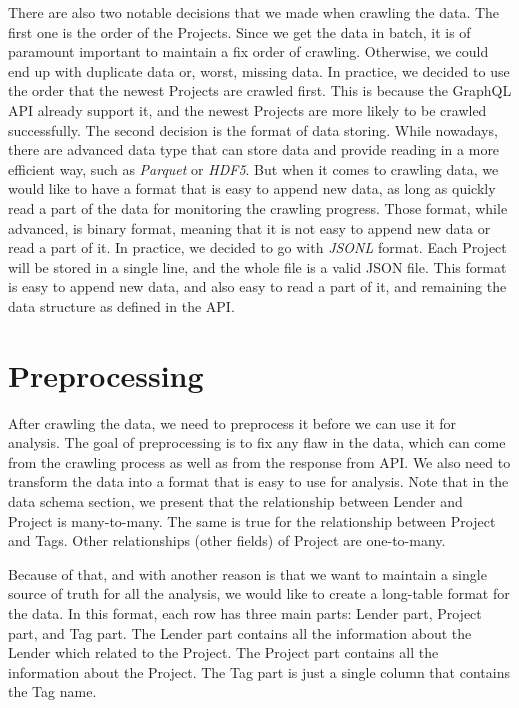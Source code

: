 There are also two notable decisions that we made when crawling the data.
The first one is the order of the Projects.
Since we get the data in batch, it is of paramount important to maintain a fix order of crawling.
Otherwise, we could end up with duplicate data or, worst, missing data.
In practice, we decided to use the order that the newest Projects are crawled first.
This is because the GraphQL API already support it, and the newest Projects are more likely to be crawled successfully.
The second decision is the format of data storing.
While nowadays, there are advanced data type that can store data and provide reading in a more efficient way,
such as \textit{Parquet}\parencite{parquet} or \textit{HDF5}\parencite{hdf5}.
But when it comes to crawling data, we would like to have a format that is easy to append new data,
as long as quickly read a part of the data for monitoring the crawling progress.
Those format, while advanced, is binary format, meaning that it is not easy to append new data or read a part of it.
In practice, we decided to go with \textit{JSONL} format.
Each Project will be stored in a single line, and the whole file is a valid JSON file.
This format is easy to append new data, and also easy to read a part of it, and remaining the data structure as defined in the API.



\section{Preprocessing}

After crawling the data, we need to preprocess it before we can use it for analysis.
The goal of preprocessing is to fix any flaw in the data, which can come from the crawling process as well as from the response from API.
We also need to transform the data into a format that is easy to use for analysis.
Note that in the data schema section, we present that the relationship between Lender and Project is many-to-many.
The same is true for the relationship between Project and Tags.
Other relationships (other fields) of Project are one-to-many.

Because of that, and with another reason is that we want to maintain a single source of truth for all the analysis,
we would like to create a long-table format for the data.
In this format, each row has three main parts: Lender part, Project part, and Tag part.
The Lender part contains all the information about the Lender which related to the Project.
The Project part contains all the information about the Project.
The Tag part is just a single column that contains the Tag name.


